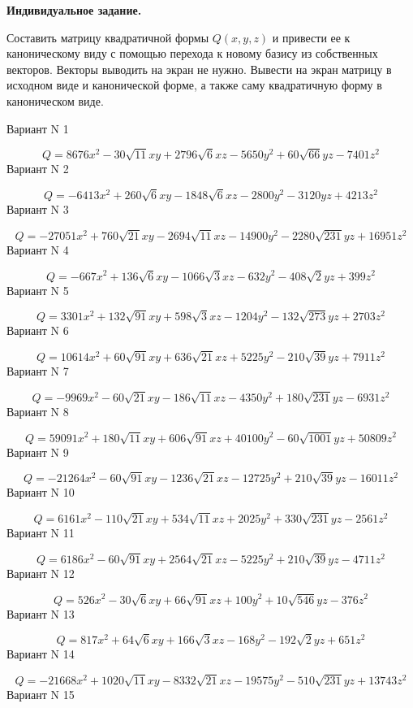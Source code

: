 \documentclass[11pt]{report}
\begin{document}
\pagestyle{empty}

{\bf Индивидуальное задание.}


Составить матрицу квадратичной формы $Q(x, y, z)$ и привести ее к каноническому виду 
с помощью перехода к новому базису из собственных векторов. 
Векторы выводить на экран не нужно. 
Вывести на экран матрицу в исходном виде и канонической форме, 
а также саму квадратичную форму в каноническом виде.

Вариант N 1

$$Q = 8676 x^{2} - 30 \sqrt{11} x y + 2796 \sqrt{6} x z - 5650 y^{2} + 60 \sqrt{66} y z - 7401 z^{2}$$Вариант N 2

$$Q = - 6413 x^{2} + 260 \sqrt{6} x y - 1848 \sqrt{6} x z - 2800 y^{2} - 3120 y z + 4213 z^{2}$$Вариант N 3

$$Q = - 27051 x^{2} + 760 \sqrt{21} x y - 2694 \sqrt{11} x z - 14900 y^{2} - 2280 \sqrt{231} y z + 16951 z^{2}$$Вариант N 4

$$Q = - 667 x^{2} + 136 \sqrt{6} x y - 1066 \sqrt{3} x z - 632 y^{2} - 408 \sqrt{2} y z + 399 z^{2}$$Вариант N 5

$$Q = 3301 x^{2} + 132 \sqrt{91} x y + 598 \sqrt{3} x z - 1204 y^{2} - 132 \sqrt{273} y z + 2703 z^{2}$$Вариант N 6

$$Q = 10614 x^{2} + 60 \sqrt{91} x y + 636 \sqrt{21} x z + 5225 y^{2} - 210 \sqrt{39} y z + 7911 z^{2}$$Вариант N 7

$$Q = - 9969 x^{2} - 60 \sqrt{21} x y - 186 \sqrt{11} x z - 4350 y^{2} + 180 \sqrt{231} y z - 6931 z^{2}$$Вариант N 8

$$Q = 59091 x^{2} + 180 \sqrt{11} x y + 606 \sqrt{91} x z + 40100 y^{2} - 60 \sqrt{1001} y z + 50809 z^{2}$$Вариант N 9

$$Q = - 21264 x^{2} - 60 \sqrt{91} x y - 1236 \sqrt{21} x z - 12725 y^{2} + 210 \sqrt{39} y z - 16011 z^{2}$$Вариант N 10

$$Q = 6161 x^{2} - 110 \sqrt{21} x y + 534 \sqrt{11} x z + 2025 y^{2} + 330 \sqrt{231} y z - 2561 z^{2}$$Вариант N 11

$$Q = 6186 x^{2} - 60 \sqrt{91} x y + 2564 \sqrt{21} x z - 5225 y^{2} + 210 \sqrt{39} y z - 4711 z^{2}$$Вариант N 12

$$Q = 526 x^{2} - 30 \sqrt{6} x y + 66 \sqrt{91} x z + 100 y^{2} + 10 \sqrt{546} y z - 376 z^{2}$$Вариант N 13

$$Q = 817 x^{2} + 64 \sqrt{6} x y + 166 \sqrt{3} x z - 168 y^{2} - 192 \sqrt{2} y z + 651 z^{2}$$Вариант N 14

$$Q = - 21668 x^{2} + 1020 \sqrt{11} x y - 8332 \sqrt{21} x z - 19575 y^{2} - 510 \sqrt{231} y z + 13743 z^{2}$$Вариант N 15
\end{document}
